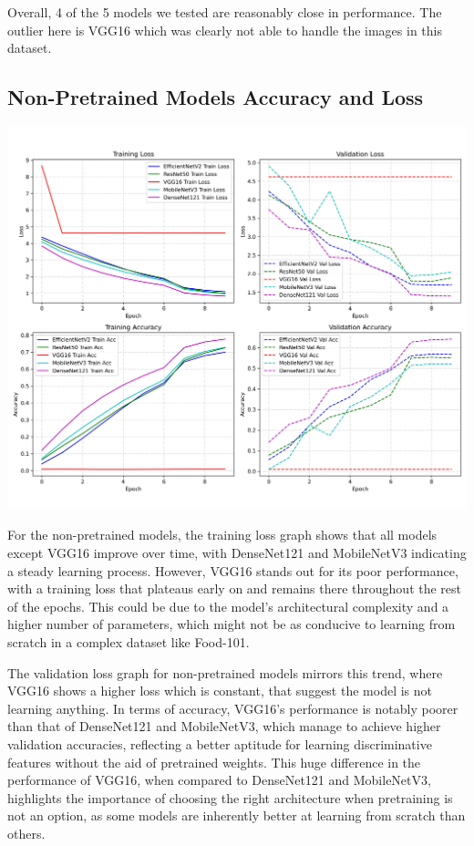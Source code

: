 \documentclass{article}
\begin{document}
Overall, 4 of the 5 models we tested are reasonably close in performance. The outlier here is VGG16 which was clearly not able to handle the images in this dataset.



\subsection*{Non-Pretrained Models Accuracy and Loss}

\begin{center}
    \includegraphics[width=1\linewidth]{./images/npt_models.jpg}
\end{center}

For the non-pretrained models, the training loss graph shows that all models except VGG16 improve over time, with DenseNet121 and MobileNetV3 indicating a steady learning process. However, VGG16 stands out for its poor performance, with a training loss that plateaus early on and remains there throughout the rest of the epochs. This could be due to the model's architectural complexity and a higher number of parameters, which might not be as conducive to learning from scratch in a complex dataset like Food-101.

The validation loss graph for non-pretrained models mirrors this trend, where VGG16 shows a higher loss which is constant, that suggest the model is not learning anything. In terms of accuracy, VGG16's performance is notably poorer than that of DenseNet121 and MobileNetV3, which manage to achieve higher validation accuracies, reflecting a better aptitude for learning discriminative features without the aid of pretrained weights. This huge difference in the performance of VGG16, when compared to DenseNet121 and MobileNetV3, highlights the importance of choosing the right architecture when pretraining is not an option, as some models are inherently better at learning from scratch than others.
\end{document}

